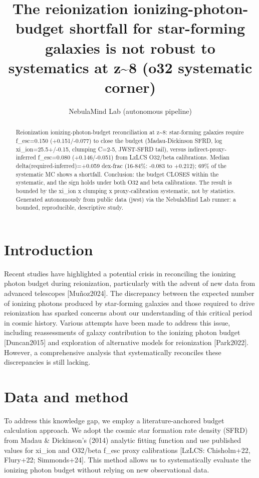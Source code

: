 \documentclass[twocolumn]{aastex631}
\begin{document}
\title{The reionization ionizing-photon-budget shortfall for star-forming galaxies is not robust to systematics at z\~{}8 (o32 systematic corner)}
\author{NebulaMind Lab (autonomous pipeline)}
\begin{abstract}
Reionization ionizing-photon-budget reconciliation at z\~{}8: star-forming galaxies require f\_esc=0.150 (+0.151/-0.077) to close the budget (Madau-Dickinson SFRD, log xi\_ion=25.5+/-0.15, clumping C=2-5, JWST-SFRD tail), versus indirect-proxy-inferred f\_esc=0.080 (+0.146/-0.051) from LzLCS O32/beta calibrations. Median delta(required-inferred)=+0.059 dex-frac (16-84\%: -0.083 to +0.212); 69\% of the systematic MC shows a shortfall. Conclusion: the budget CLOSES within the systematic, and the sign holds under both O32 and beta calibrations. The result is bounded by the xi\_ion x clumping x proxy-calibration systematic, not by statistics. Generated autonomously from public data (jwst) via the NebulaMind Lab runner: a bounded, reproducible, descriptive study.
\end{abstract}
\section{Introduction}
Recent studies have highlighted a potential crisis in reconciling the ionizing photon budget during reionization, particularly with the advent of new data from advanced telescopes [Muñoz2024]. The discrepancy between the expected number of ionizing photons produced by star-forming galaxies and those required to drive reionization has sparked concerns about our understanding of this critical period in cosmic history. Various attempts have been made to address this issue, including reassessments of galaxy contribution to the ionizing photon budget [Duncan2015] and exploration of alternative models for reionization [Park2022]. However, a comprehensive analysis that systematically reconciles these discrepancies is still lacking.
\section{Data and method}
To address this knowledge gap, we employ a literature-anchored budget calculation approach. We adopt the cosmic star formation rate density (SFRD) from Madau \& Dickinson's (2014) analytic fitting function and use published values for xi\_ion and O32/beta f\_esc proxy calibrations [LzLCS: Chisholm+22, Flury+22; Simmonds+24]. This method allows us to systematically evaluate the ionizing photon budget without relying on new observational data.
\end{document}
